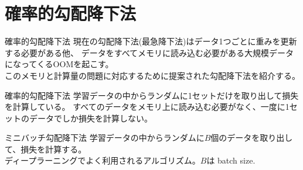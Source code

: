 \documentclass[aspectratio=169, dvipdfmx, 11pt]{beamer} %
\begin{document}

\section{確率的勾配降下法}
\begin{frame}{確率的勾配降下法}
    現在の勾配降下法(最急降下法)はデータ1つごとに重みを更新する必要がある他、
    データをすべてメモリに読み込む必要がある大規模データになってくるOOMを起こす。\\
    このメモリと計算量の問題に対応するために提案された勾配降下法を紹介する。
        \begin{alertblock}{確率的勾配降下法}
            学習データの中からランダムに1セットだけを取り出して損失を計算している。
            すべてのデータをメモリ上に読み込む必要がなく、一度に1セットのデータでしか損失を計算しない。
        \end{alertblock}
        \begin{exampleblock}{ミニバッチ勾配降下法}
            学習データの中からランダムに\(B\)個のデータを取り出して、損失を計算する。\\
            ディープラーニングでよく利用されるアルゴリズム。\(B\)は batch size.
        \end{exampleblock}
\end{frame}
\end{document}
